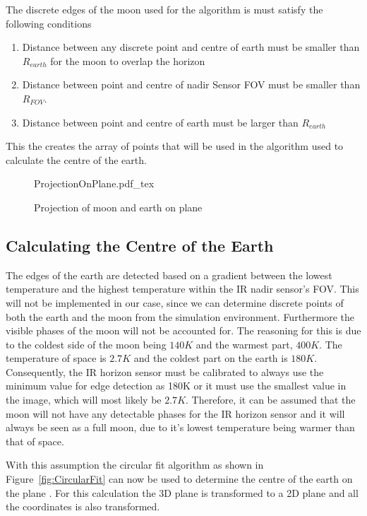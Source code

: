 The discrete edges of the moon used for the algorithm is must satisfy the following conditions
\begin{enumerate}
	\item Distance between any discrete point and centre of earth must be smaller than $R_{earth}$ for the moon to overlap the horizon
	\item Distance between point and centre of nadir Sensor FOV must be smaller than $R_{FOV}$.
	\item Distance between point and centre of earth must be larger than $R_{earth}$
\end{enumerate}

This the creates the array of points that will be used in the algorithm used to calculate the centre of the earth.

\begin{figure}[!hbt]
	\centering
	\def\svgwidth{14cm}
	{ProjectionOnPlane.pdf_tex}
	\caption{Projection of moon and earth on plane}
	\label{fig:ProjectionOnPlane}
\end{figure}

\subsection{Calculating the Centre of the Earth}
\label{section: Calculating the Centre of the Earth}
The edges of the earth are detected based on a gradient between the lowest temperature and the highest temperature within the IR nadir sensor's FOV. This will not be implemented in our case, since we can determine discrete points of both the earth and the moon from the simulation environment. Furthermore the visible phases of the moon will not be accounted for. The reasoning for this is due to the coldest side of the moon being $140K$ and the warmest part, $400K$. The temperature of space is $2.7K$ and the coldest part on the earth is $180K$. Consequently, the IR horizon sensor must be calibrated to always use the minimum value for edge detection as 180K or it must use the smallest value in the image, which will most likely be $2.7K$. Therefore, it can be assumed that the moon will not have any detectable phases for the IR horizon sensor and it will always be seen as a full moon, due to it's lowest temperature being warmer than that of space. 

With this assumption the circular fit algorithm as shown in Figure~\ref{fig:CircularFit} can now be used to determine the centre of the earth on the plane \cite{Wessels2018}. For this calculation the 3D plane is transformed to a 2D plane and all the coordinates is also transformed.  

